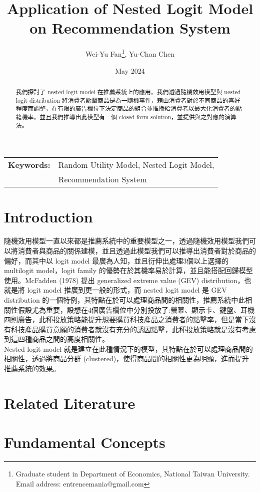 \documentclass[12pt]{article}
\title{Application of Nested Logit Model on Recommendation System}
\author{Wei-Yu Fan\thanks{
Graduate student in Department of Economics, National Taiwan University.\\ 
Email address: entrencemania@gmail.com
}, Yu-Chan Chen
}
\date{May 2024}
\theoremstyle{definition}
\begin{document}
\maketitle
\begin{spacing}{0}
\begin{abstract}\noindent
我們探討了 nested logit model 在推薦系統上的應用。我們透過隨機效用模型與 nested logit distribution 將消費者點擊商品是為一隨機事件，藉由消費者對於不同商品的喜好程度而調整，在有限的廣告欄位下決定商品的組合並推播給消費者以最大化消費者的點籍機率。並且我們推導出此模型有一個 closed-form solution，並提供與之對應的演算法。
\end{abstract}
\end{spacing}
\begin{tabular}{rl}
\\
\textbf{Keywords:} &Random Utility Model, Nested Logit Model, \\
&Recommendation System
\end{tabular}

\newpage


\section{Introduction}
隨機效用模型一直以來都是推薦系統中的重要模型之一，透過隨機效用模型我們可以將消費者與商品的關係建模，並且透過此模型我們可以推導出消費者對於商品的偏好，而其中以 logit model 最廣為人知，並且衍伸出處理3個以上選擇的 multilogit model，logit family 的優勢在於其機率易於計算，並且能搭配回歸模型使用。McFadden (1978) 提出 generalized extreme value (GEV) distribution，也就是將 logit model 推廣到更一般的形式，而 nested logit model 是 GEV distribution 的一個特例，其特點在於可以處理商品間的相關性，推薦系統中此相關性假設尤為重要，設想在4個廣告欄位中分別投放了:螢幕、顯示卡、鍵盤、耳機四則廣告，此種投放策略能提升想要購買科技產品之消費者的點擊率，但是當下沒有科技產品購買意願的消費者就沒有充分的誘因點擊，此種投放策略就是沒有考慮到這四種商品之間的高度相關性。\\
\indent Nested logit model 就是建立在此種情況下的模型，其特點在於可以處理商品間的相關性，透過將商品分群 (clustered)，使得商品間的相關性更為明顯，進而提升推薦系統的效果。\\

\section{Related Literature}

\section{Fundamental Concepts}
\end{document}
